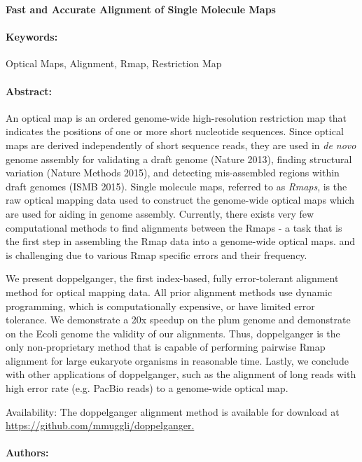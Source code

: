 \noindent
\large {\bf Fast and Accurate Alignment of Single Molecule Maps} 


\normalsize 


\noindent \paragraph{Keywords:} Optical Maps, Alignment, Rmap, Restriction Map

\noindent \paragraph{Abstract:} 

An optical map is an ordered genome-wide high-resolution restriction map that indicates the positions of one or
more short nucleotide sequences. Since optical maps are derived
independently of short sequence reads, they are used in {\it de novo}
genome assembly for validating a draft genome (Nature 2013),
finding structural variation (Nature Methods 2015), and detecting
mis-assembled regions within draft genomes (ISMB 2015). Single
molecule maps, referred to as {\it Rmaps}, is the raw optical mapping
data used to construct the genome-wide optical maps which are
used for aiding in genome assembly. Currently, there exists very few
computational methods to find alignments between the Rmaps - a
task that is the first step in assembling the Rmap data into a genome-wide
 optical maps. and is challenging due to various Rmap specific
errors and their frequency.

 We present {\sc doppelganger}, the first index-based, fully
error-tolerant alignment method for optical mapping data. All
prior alignment methods use dynamic programming, which is
computationally expensive, or have limited error tolerance. We
demonstrate a 20x speedup on the plum genome and demonstrate
on the Ecoli genome the validity of our alignments. Thus,
{\sc doppelganger} is the only non-proprietary method that is capable of
performing pairwise Rmap alignment for large eukaryote organisms
in reasonable time. Lastly, we conclude with other applications of
{\sc doppelganger}, such as the alignment of long reads with high error
rate (e.g. PacBio reads) to a genome-wide optical map.

Availability: The {\sc doppelganger} alignment method is available for
download at \url{https://github.com/mmuggli/doppelganger.}

\noindent \paragraph{Authors:} 

